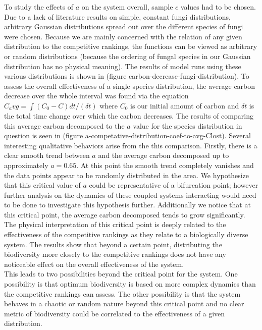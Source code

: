 \documentclass[12pt]{article}
\begin{document}
\begin{multicols}{2}
To study the effects of $a$ on the system overall, sample $c$ values had to be chosen. Due to a lack of literature results on simple, constant fungi distributions, arbitrary Gaussian distributions spread out over the different species of fungi were chosen. Because we are mainly concerned with the relation of any given distribution to the competitive rankings, the functions can be viewed as arbitrary or random distributions (because the ordering of fungal species in our Gaussian distribution has no physical meaning). The results of model runs using these various distributions is shown in (figure carbon-decrease-fungi-distribution). To assess the overall effectiveness of a single species distribution, the average carbon decrease over the whole interval was found via the equation $C_avg = \int (C_{0}-C)dt/(\delta t)$ where $C_{0}$ is our initial amount of carbon and $\delta t$ is the total time change over which the carbon decreases. The results of comparing this average carbon decomposed to the $a$ value for the species distribution in question is seen in (figure a-competative-distribution-coef-to-avg-Clost). Several interesting qualitative behaviors arise from the this comparison. Firstly, there is a clear smooth trend between $a$ and the average carbon decomposed up to approximately $a=0.65$. At this point the smooth trend completely vanishes and the data points appear to be randomly distributed in the area. We hypothesize that this critical value of $a$ could be representative of a bifurcation point; however further analysis on the dynamics of these coupled systems interacting would need to be done to investigate this hypothesis further. Additionally we notice that at this critical point, the average carbon decomposed tends to grow significantly. The physical interpretation of this critical point is deeply related to the effectiveness of the competitive rankings as they relate to a biologically diverse system. The results show that beyond a certain point, distributing the biodiversity more closely to the competitive rankings does not have any noticeable effect on the overall effectiveness of the system. \\
This leads to two possibilities beyond the critical point for the system. One possibility is that optimum biodiversity is based on more complex dynamics than the competitive rankings can assess. The other possibility is that the system behaves in a chaotic or random nature beyond this critical point and no clear metric of biodiversity could be correlated to the effectiveness of a given distribution.


\end{multicols}
\end{document}
